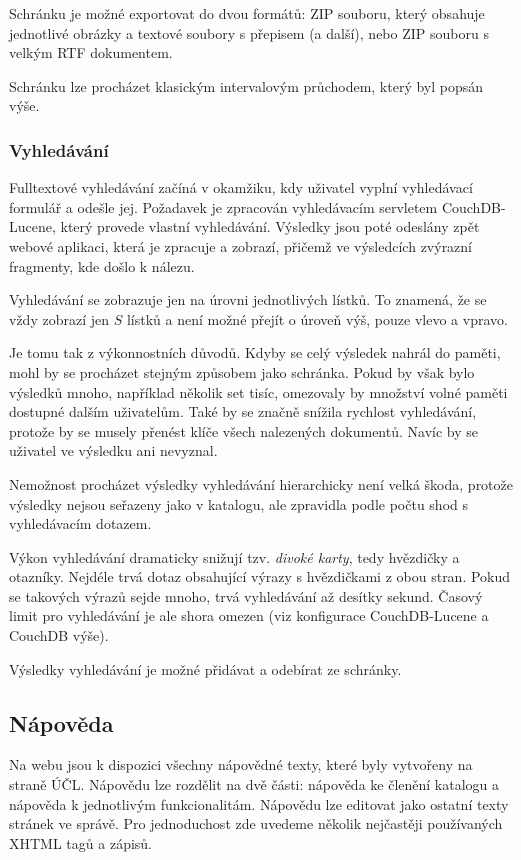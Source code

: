 Schránku je možné exportovat do dvou formátů: ZIP souboru, který obsahuje jednotlivé obrázky a textové soubory s přepisem (a další), nebo ZIP souboru s velkým RTF dokumentem. 

Schránku lze procházet klasickým intervalovým průchodem, který byl popsán výše.

\subsubsection{Vyhledávání}

Fulltextové vyhledávání začíná v okamžiku, kdy uživatel vyplní vyhledávací formulář a odešle jej. Požadavek je zpracován vyhledávacím servletem CouchDB-Lucene, který provede vlastní vyhledávání. Výsledky jsou poté odeslány zpět webové aplikaci, která je zpracuje a zobrazí, přičemž ve výsledcích zvýrazní  fragmenty, kde došlo k nálezu.

Vyhledávání se zobrazuje jen na úrovni jednotlivých lístků. To znamená, že se vždy zobrazí jen $S$ lístků a není možné přejít o úroveň výš, pouze vlevo a vpravo. 

Je tomu tak z výkonnostních důvodů. Kdyby se celý výsledek nahrál do paměti, mohl by se procházet stejným způsobem jako schránka. Pokud by však bylo výsledků mnoho, například několik set tisíc, omezovaly by množství volné paměti dostupné dalším uživatelům. Také by se značně snížila rychlost vyhledávání, protože by se musely přenést klíče všech nalezených dokumentů. Navíc by se uživatel ve výsledku ani nevyznal. 

Nemožnost procházet výsledky vyhledávání hierarchicky není velká škoda, protože výsledky nejsou seřazeny jako v katalogu, ale zpravidla podle počtu shod s vyhledávacím dotazem.

Výkon vyhledávání dramaticky snižují tzv. {\em divoké karty}, tedy hvězdičky a otazníky. Nejdéle trvá dotaz obsahující výrazy s hvězdičkami z obou stran. Pokud se takových výrazů sejde mnoho, trvá vyhledávání až desítky sekund. Časový limit pro vyhledávání je ale shora omezen (viz konfigurace CouchDB-Lucene a CouchDB výše).

Výsledky vyhledávání je možné přidávat a odebírat ze schránky.

\subsection{Nápověda}

Na webu jsou k dispozici všechny nápovědné texty, které byly vytvořeny na straně ÚČL. Nápovědu lze rozdělit na dvě části: nápověda ke členění katalogu a nápověda k jednotlivým funkcionalitám. Nápovědu lze editovat jako ostatní texty stránek ve správě. Pro jednoduchost zde uvedeme několik nejčastěji používaných XHTML tagů a zápisů. 


